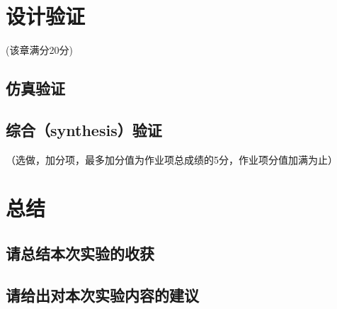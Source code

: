 \section{设计验证}
\begin{center}
    (该章满分20分)
\end{center}

\subsection{仿真验证}


\subsection{综合（synthesis）验证}
\begin{center}
    （选做，加分项，最多加分值为作业项总成绩的5分，作业项分值加满为止）
\end{center}


\section{总结}
\subsection{请总结本次实验的收获}

\subsection{请给出对本次实验内容的建议}